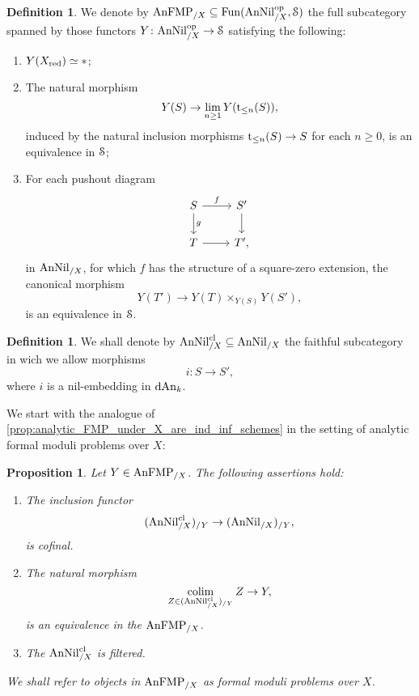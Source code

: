 \documentclass[10pt,a4paper,reqno]{amsart} %
\theoremstyle{plain}
\newtheorem{prop}[thm]{Proposition}
\theoremstyle{definition}
\newtheorem{defin}[thm]{Definition}
\theoremstyle{remark}
\numberwithin{equation}{section}
\begin{document}
\begin{defin} \label{defin:analytic_formal_problems_over_X}
    We denote by $\mathrm{AnFMP}_{/ X} \subseteq \operatorname{Fun}(\mathrm{AnNil}_{/ X} ^\mathrm{op}, \mathcal S)$ the full subcategory spanned by those functors $Y \colon \mathrm{AnNil}_{/ X} ^\mathrm{op} \to \mathcal S$
    satisfying the following:
    \begin{enumerate}
        \item $Y(X_{\mathrm{red}}) \simeq *$;
        \item The natural morphism
            \[
                Y(S) \to \lim_{n \ge 1} Y(\mathrm t_{\le n}(S)),  
            \]
        induced by the natural inclusion morphisms $\mathrm t_{\le n}(S) \to S$ for each $n \ge 0$, is an equivalence in $\mathcal S$;
        \item For each pushout diagram
            \[
            \begin{tikzcd}
                S \ar{r}{f} \ar{d}{g}  & S' \ar{d} \\
                T \ar{r} & T',
            \end{tikzcd}
            \]
        in $\mathrm{AnNil}_{/ X}$, for which $f$ has the structure of a square-zero extension, the canonical morphism
            \[
                Y(T') \to Y(T) \times_{Y(S)} Y(S'),
            \]
        is an equivalence in $\mathcal S$.
    \end{enumerate}
\end{defin}

\begin{defin}
    We shall denote by $\mathrm{AnNil}_{/X}^{\mathrm{cl}} \subseteq \mathrm{AnNil}_{/X}$ the faithful subcategory in wich we allow morphisms
        \[
            i \colon S \to S'  ,
        \]
    where $i$ is a nil-embedding in $\mathrm{dAn}_k$.
\end{defin}

We start with the analogue of \cref{prop:analytic_FMP_under_X_are_ind_inf_schemes} in the setting of analytic formal moduli problems over $X$:

\begin{prop} \label{prop:required_conditions_for_formal_moduli_problems}
    Let $Y \in \mathrm{AnFMP}_{/X}$. The following assertions hold:
    \begin{enumerate}
        \item The inclusion functor
            \[
                (\mathrm{AnNil}^{\mathrm{cl}}_{/X})_{/Y}  \to (\mathrm{AnNil}_{/X})_{/Y},
            \]
        is cofinal.
        \item The natural morphism
            \[
                \operatorname*{colim}_{Z \in (\mathrm{AnNil}^{\mathrm{cl}}_{/X})_{/Y}}  Z \to Y,
            \]
        is an equivalence in the \infcat $\mathrm{AnFMP}_{/X}$.
        \item The \infcat $\mathrm{AnNil}_{/X}^{\mathrm{cl}}$ is filtered.
    \end{enumerate}
    We shall refer to objects in $\mathrm{AnFMP}_{/ X}$ as formal moduli problems over $X$.
\end{prop}
\end{document}
